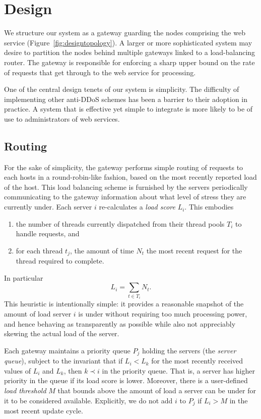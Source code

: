 \documentclass[twocolumn]{article}
\begin{document}
\section{Design}

We structure our system as a gateway guarding the nodes comprising the web service (Figure~\ref{fig:designtopology}). A larger or more sophisticated system may desire to partition the nodes behind multiple gateways linked to a load-balancing router. The gateway is responsible for enforcing a sharp upper bound on the rate of requests that get through to the web service for processing.

One of the central design tenets of our system is simplicity. The difficulty of implementing other anti-DDoS schemes has been a barrier to their adoption in practice. A system that is effective yet simple to integrate is more likely to be of use to administrators of web services.

\subsection{Routing}

For the sake of simplicity, the gateway performs simple routing of requests to each hosts in a round-robin-like fashion, based on the most recently reported load of the host. This load balancing scheme is furnished by the servers periodically communicating to the gateway information about what level of stress they are currently under. Each server $i$ re-calculates a \emph{load score} $L_i$. This embodies
\begin{enumerate}
\item the number of threads currently dispatched from their thread pools $T_i$ to handle requests, and
\item for each thread $t_j$, the amount of time $N_t$ the most recent request for the thread required to complete.
\end{enumerate}
In particular
\begin{equation}L_i=\sum_{t\in T_i} N_t.\end{equation}
This heuristic is intentionally simple: it provides a reasonable snapshot of the amount of load server $i$ is under without requiring too much processing power, and hence behaving as transparently as possible while also not appreciably skewing the actual load of the server.

Each gateway maintains a priority queue $P_j$ holding the servers (the \emph{server queue}), subject to the invariant that if $L_i<L_k$ for the most recently received values of $L_i$ and $L_k$, then $k\prec i$ in the priority queue. That is, a server has higher priority in the queue if its load score is lower. Moreover, there is a user-defined \emph{load threshold} $M$ that bounds above the amount of load a server can be under for it to be considered available. Explicitly, we do not add $i$ to $P_j$ if $L_i>M$ in the most recent update cycle.
\end{document}
